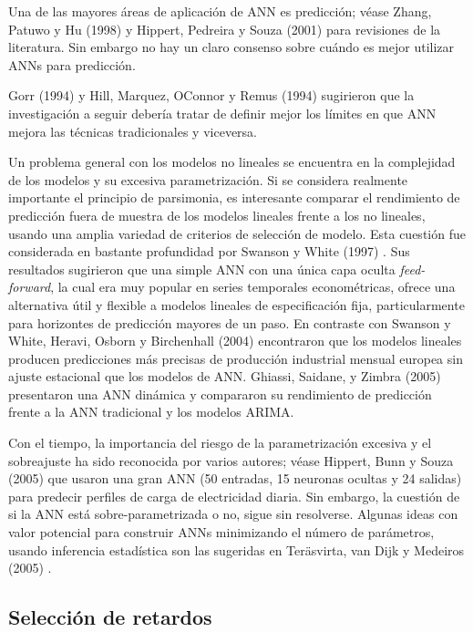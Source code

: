 \documentclass{llncs}
\begin{document}
Una de las mayores áreas de aplicación de ANN es predicción; véase Zhang, Patuwo y Hu (1998) \cite{Zhang199835} y Hippert, Pedreira y Souza (2001) \cite{Hippert200144} para revisiones de la literatura. Sin embargo no hay un claro consenso sobre cuándo es mejor utilizar ANNs para predicción.

Gorr (1994) \cite{Gorr19941} y Hill, Marquez, OConnor y Remus (1994) \cite{Hill19945} sugirieron que la investigación a seguir debería tratar de definir mejor los límites en que ANN mejora las técnicas tradicionales y viceversa. 

Un problema general con los modelos no lineales se encuentra en la complejidad de los modelos y su excesiva parametrización. Si se considera realmente importante el principio de parsimonia, es interesante comparar el rendimiento de predicción fuera de muestra de los modelos lineales frente a los no lineales, usando una amplia variedad de criterios de selección de modelo. Esta cuestión fue considerada en bastante profundidad por Swanson y White (1997) \cite{Swanson1997439}. Sus resultados sugirieron que una simple ANN con una única capa oculta \emph{feed-forward}, la cual era muy popular en series temporales econométricas, ofrece una alternativa útil y flexible a modelos lineales de especificación fija, particularmente para horizontes de predicción mayores de un paso. En contraste con Swanson y White, Heravi, Osborn y Birchenhall (2004) \cite{Heravi2004435} encontraron que los modelos lineales producen predicciones más precisas de producción industrial mensual europea sin ajuste estacional que los modelos de ANN. Ghiassi, Saidane, y Zimbra (2005) \cite{Ghiassi2005341} presentaron una ANN dinámica y compararon su rendimiento de predicción frente a la ANN tradicional y los modelos ARIMA.

Con el tiempo, la importancia del riesgo de la parametrización excesiva y el sobreajuste ha sido reconocida por varios autores; véase Hippert, Bunn y Souza (2005) \cite{Hippert2005425} que usaron una gran ANN (50 entradas, 15 neuronas ocultas y 24 salidas) para predecir perfiles de carga de electricidad diaria. Sin embargo, la cuestión de si la ANN está sobre-parametrizada o no, sigue sin resolverse. Algunas ideas con valor potencial para construir ANNs minimizando el número de parámetros, usando inferencia estadística son las sugeridas en Teräsvirta, van Dijk y Medeiros (2005) \cite{Terasvirta2005755}.

\subsection{Selección de retardos}
\end{document}
